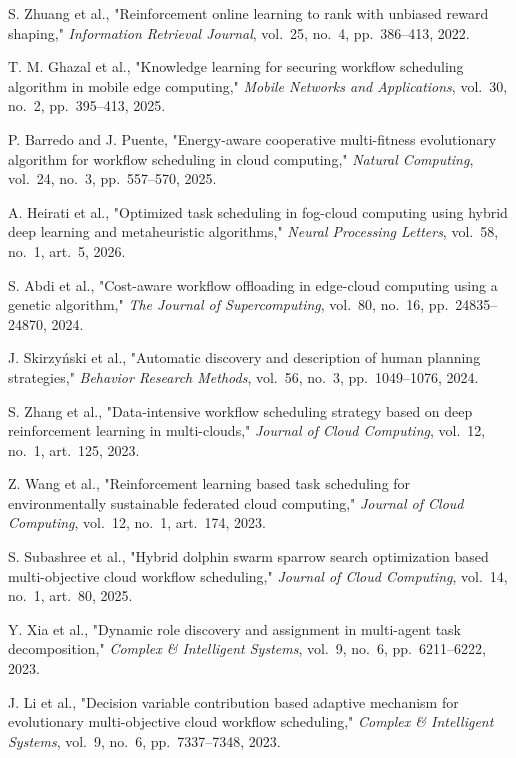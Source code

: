S. Zhuang et al., "Reinforcement online learning to rank with unbiased reward shaping," \textit{Information Retrieval Journal}, vol.~25, no.~4, pp.~386--413, 2022.

T. M. Ghazal et al., "Knowledge learning for securing workflow scheduling algorithm in mobile edge computing," \textit{Mobile Networks and Applications}, vol.~30, no.~2, pp.~395--413, 2025.

P. Barredo and J. Puente, "Energy-aware cooperative multi-fitness evolutionary algorithm for workflow scheduling in cloud computing," \textit{Natural Computing}, vol.~24, no.~3, pp.~557--570, 2025.

A. Heirati et al., "Optimized task scheduling in fog-cloud computing using hybrid deep learning and metaheuristic algorithms," \textit{Neural Processing Letters}, vol.~58, no.~1, art.~5, 2026.

S. Abdi et al., "Cost-aware workflow offloading in edge-cloud computing using a genetic algorithm," \textit{The Journal of Supercomputing}, vol.~80, no.~16, pp.~24835--24870, 2024.

J. Skirzy{\'n}ski et al., "Automatic discovery and description of human planning strategies," \textit{Behavior Research Methods}, vol.~56, no.~3, pp.~1049--1076, 2024.

S. Zhang et al., "Data-intensive workflow scheduling strategy based on deep reinforcement learning in multi-clouds," \textit{Journal of Cloud Computing}, vol.~12, no.~1, art.~125, 2023.

Z. Wang et al., "Reinforcement learning based task scheduling for environmentally sustainable federated cloud computing," \textit{Journal of Cloud Computing}, vol.~12, no.~1, art.~174, 2023.

S. Subashree et al., "Hybrid dolphin swarm sparrow search optimization based multi-objective cloud workflow scheduling," \textit{Journal of Cloud Computing}, vol.~14, no.~1, art.~80, 2025.

Y. Xia et al., "Dynamic role discovery and assignment in multi-agent task decomposition," \textit{Complex \& Intelligent Systems}, vol.~9, no.~6, pp.~6211--6222, 2023.

J. Li et al., "Decision variable contribution based adaptive mechanism for evolutionary multi-objective cloud workflow scheduling," \textit{Complex \& Intelligent Systems}, vol.~9, no.~6, pp.~7337--7348, 2023.


